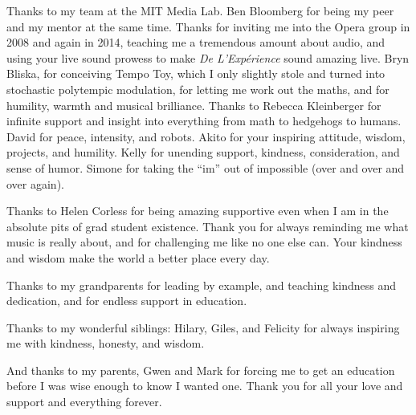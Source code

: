 \begin{fullwidth}
\vspace{5mm}
\noindent Thanks to my team at the MIT Media Lab. Ben Bloomberg for
being my peer and my mentor at the same time. Thanks for inviting me
into the Opera group in 2008 and again in 2014, teaching me a
tremendous amount about audio, and using your live sound prowess to
make \textit{De L'Exp\'{e}rience} sound amazing live. Bryn Bliska, for
conceiving Tempo Toy, which I only slightly stole and turned into
stochastic polytempic modulation, for letting me work out the maths,
and for humility, warmth and musical brilliance. Thanks to Rebecca
Kleinberger for infinite support and insight into everything from math
to hedgehogs to humans. David for peace, intensity, and robots. Akito
for your inspiring attitude, wisdom, projects, and humility. Kelly for
unending support, kindness, consideration, and sense of humor. Simone
for taking the ``im'' out of impossible (over and over and over
again).

\vspace{5mm}
\noindent Thanks to Helen Corless for being amazing supportive even
when I am in the absolute pits of grad student existence. Thank you
for always reminding me what music is really about, and for
challenging me like no one else can. Your kindness and wisdom make
the world a better place every day.

\vspace{5mm}
\noindent Thanks to my grandparents for leading by example, and teaching
kindness and dedication, and for endless support in education.

\vspace{5mm}
\noindent Thanks to my wonderful siblings: Hilary, Giles, and Felicity
for always inspiring me with kindness, honesty, and wisdom.

\vspace{5mm}
\noindent And thanks to my parents, Gwen and Mark for forcing me to get an
education before I was wise enough to know I wanted one. Thank you for
all your love and support and everything forever.
\end{fullwidth}

